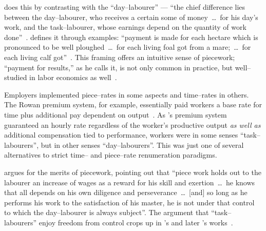 \documentclass[trackingWork]{subfiles}
\begin{document}
\citeauthor{hughRaynbirdTaskWork} does this by contrasting with the ``day--labourer'' ---
``the chief difference lies between the day--labourer,
who receives a certain some of money~\dots~for his day's work,
and the task--labourer, whose earnings depend on the quantity of work done''~\cite{hughRaynbirdTaskWork}.
\citeauthor{10.2307/2338394} defines it through examples:
``payment is made for each hectare which is pronounced to be well ploughed~\dots~for each living foal got from a mare;~\dots~for each living calf got''~\cite{10.2307/2338394}.
This framing offers an intuitive sense of piecework;
``payment for results,'' as he calls it,
is not only common in practice, but
well--studied in labor economics as well~\cite{Figlio2007901,weitzman1976new,10.2307/3003414,BJIR:BJIR038}.

Employers implemented piece--rates in some aspects and
time--rates in others.
The Rowan premium system, for example,
essentially paid workers
a base rate for time plus
additional pay dependent on output~\cite{rowan1901premium}.
As \citeauthor{rowan1901premium}'s premium system guaranteed an hourly rate
regardless of the worker's productive output
\textit{as well as} additional compensation tied to performance,
workers were
in some senses ``task--labourers'', but
in other senses ``day--labourers''.
This was just one of several alternatives to strict time-- and piece--rate renumeration paradigms.

\citeauthor{hughRaynbirdTaskWork} argues for the merits of piecework,
pointing out that
``piece work holds out to the labourer an increase of wages as a reward for his skill and exertion~\dots~he knows that all depends on his own diligence and perseverance~\dots~[and] so long as he performs his work to the satisfaction of his master, he is not under that control to which the day--labourer is always subject''.
The argument that ``task--labourers'' enjoy freedom from control crops up in \citeauthor{hughRaynbirdTaskWork}'s and later \citeauthor{rowan1901premium}'s works~\cite{hughRaynbirdTaskWork,rowan1901premium}.
\end{document}
